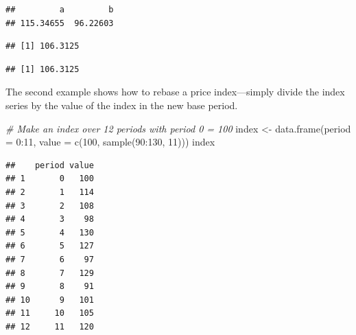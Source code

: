 \documentclass[
]{article}
\newenvironment{Shaded}{\begin{snugshade}}{\end{snugshade}}
\newcommand{\AttributeTok}[1]{\textcolor[rgb]{0.77,0.63,0.00}{#1}}
\newcommand{\CommentTok}[1]{\textcolor[rgb]{0.56,0.35,0.01}{\textit{#1}}}
\newcommand{\DecValTok}[1]{\textcolor[rgb]{0.00,0.00,0.81}{#1}}
\newcommand{\FunctionTok}[1]{\textcolor[rgb]{0.00,0.00,0.00}{#1}}
\newcommand{\NormalTok}[1]{#1}
\newcommand{\OtherTok}[1]{\textcolor[rgb]{0.56,0.35,0.01}{#1}}
\newcommand{\SpecialCharTok}[1]{\textcolor[rgb]{0.00,0.00,0.00}{#1}}
\begin{document}
\begin{verbatim}
##         a         b 
## 115.34655  96.22603
\end{verbatim}

\begin{Shaded}
\end{Shaded}

\begin{verbatim}
## [1] 106.3125
\end{verbatim}

\begin{Shaded}
\end{Shaded}

\begin{verbatim}
## [1] 106.3125
\end{verbatim}

The second example shows how to rebase a price index---simply divide the index series by the value of the index in the new base period.

\begin{Shaded}
\begin{Highlighting}[]
\CommentTok{\# Make an index over 12 periods with period 0 = 100}
\NormalTok{index }\OtherTok{\textless{}{-}} \FunctionTok{data.frame}\NormalTok{(}\AttributeTok{period =} \DecValTok{0}\SpecialCharTok{:}\DecValTok{11}\NormalTok{, }\AttributeTok{value =} \FunctionTok{c}\NormalTok{(}\DecValTok{100}\NormalTok{, }\FunctionTok{sample}\NormalTok{(}\DecValTok{90}\SpecialCharTok{:}\DecValTok{130}\NormalTok{, }\DecValTok{11}\NormalTok{)))}
\NormalTok{index}
\end{Highlighting}
\end{Shaded}

\begin{verbatim}
##    period value
## 1       0   100
## 2       1   114
## 3       2   108
## 4       3    98
## 5       4   130
## 6       5   127
## 7       6    97
## 8       7   129
## 9       8    91
## 10      9   101
## 11     10   105
## 12     11   120
\end{verbatim}
\end{document}
